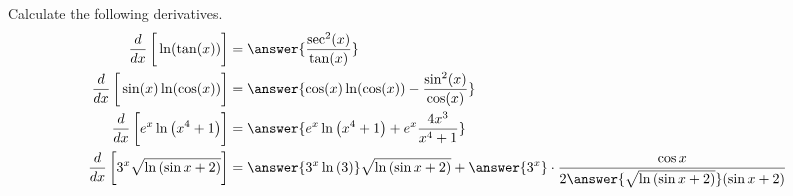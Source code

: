 \documentclass{ximera}
\author{Nela Lakos \and Kyle Parsons}
\begin{document}
\begin{exercise}

Calculate the following derivatives.
\begin{align*}
\ddx\left[\vphantom{\ddx}\ln(\tan(x))\right] &= \answer{\frac{\sec^2(x)}{\tan(x)}}\\
\ddx\left[\vphantom{\ddx}\sin(x)\ln(\cos(x))\right] &= \answer{\cos(x)\ln(\cos(x)) - \frac{\sin^2(x)}{\cos(x)}}\\
\ddx\left[\vphantom{\ddx}e^x\ln\left(x^4+1\right)\right] &= \answer{e^x\ln\left(x^4+1\right) + e^x\frac{4x^3}{x^4+1}}\\
\ddx\left[\vphantom{\ddx}3^x\sqrt{\ln{\left(\sin{x}+2\right)}}\right] &= \answer{3^{x}\ln{(3)}}\sqrt{\ln{\left(\sin{x}+2\right)}}+\answer{3^{x}}\cdot\dfrac{\cos{x}}{2\answer{\sqrt{\ln{(\sin{x}+2)}}}(\sin{x}+2)}
\end{align*}
\end{exercise}
\end{document}
